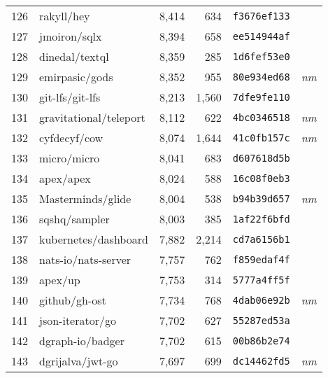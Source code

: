 {\begin{supertabular}{llrrll}
        126 &                         rakyll/hey &  8,414 &    634 &  \texttt{f3676ef133} &              \\
        127 &                       jmoiron/sqlx &  8,394 &    658 &  \texttt{ee514944af} &              \\
        128 &                     dinedal/textql &  8,359 &    285 &  \texttt{1d6fef53e0} &              \\
        129 &                     emirpasic/gods &  8,352 &    955 &  \texttt{80e934ed68} &  \textit{nm} \\
        130 &                    git-lfs/git-lfs &  8,213 &  1,560 &  \texttt{7dfe9fe110} &              \\
        131 &             gravitational/teleport &  8,112 &    622 &  \texttt{4bc0346518} &  \textit{nm} \\
        132 &                       cyfdecyf/cow &  8,074 &  1,644 &  \texttt{41c0fb157c} &  \textit{nm} \\
        133 &                        micro/micro &  8,041 &    683 &  \texttt{d607618d5b} &              \\
        134 &                          apex/apex &  8,024 &    588 &  \texttt{16c08f0eb3} &              \\
        135 &                  Masterminds/glide &  8,004 &    538 &  \texttt{b94b39d657} &  \textit{nm} \\
        136 &                      sqshq/sampler &  8,003 &    385 &  \texttt{1af22f6bfd} &              \\
        137 &               kubernetes/dashboard &  7,882 &  2,214 &  \texttt{cd7a6156b1} &              \\
        138 &                nats-io/nats-server &  7,757 &    762 &  \texttt{f859edaf4f} &              \\
        139 &                            apex/up &  7,753 &    314 &  \texttt{5777a4ff5f} &              \\
        140 &                      github/gh-ost &  7,734 &    768 &  \texttt{4dab06e92b} &  \textit{nm} \\
        141 &                   json-iterator/go &  7,702 &    627 &  \texttt{55287ed53a} &              \\
        142 &                   dgraph-io/badger &  7,702 &    615 &  \texttt{00b86b2e74} &              \\
        143 &                   dgrijalva/jwt-go &  7,697 &    699 &  \texttt{dc14462fd5} &  \textit{nm} \\

\end{supertabular}}
